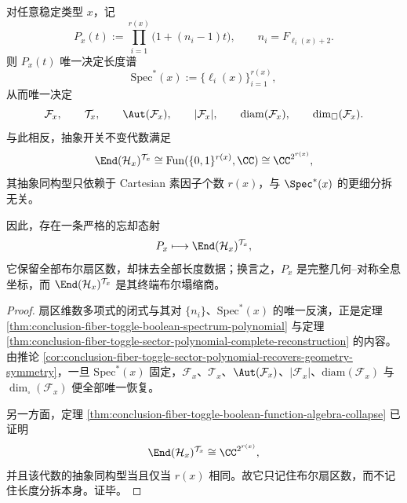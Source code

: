 \begin{theorem}\label{thm:conclusion-sector-polynomial-vs-toggle-algebra-holography-collapse-splitting}
对任意稳定类型 \(x\)，记
\[
P_x(t):=\prod_{i=1}^{r(x)}\bigl(1+(n_i-1)t\bigr),
\qquad
n_i=F_{\ell_i(x)+2}.
\]
则 \(P_x(t)\) 唯一决定长度谱
\[
\mathrm{Spec}^\ast(x):=\{\ell_i(x)\}_{i=1}^{r(x)},
\]
从而唯一决定
\[
\mathcal F_x,\qquad
\mathcal T_x,\qquad
\Aut(\mathcal F_x),\qquad
|\mathcal F_x|,\qquad
\mathrm{diam}(\mathcal F_x),\qquad
\dim_\square(\mathcal F_x).
\]
与此相反，抽象开关不变代数满足
\[
\End(\mathcal H_x)^{\mathcal T_x}
\cong
\mathrm{Fun}(\{0,1\}^{r(x)},\CC)
\cong
\CC^{2^{r(x)}},
\]
其抽象同构型只依赖于 Cartesian 素因子个数 \(r(x)\)，与 \(\Spec^\ast(x)\) 的更细分拆无关。

因此，存在一条严格的忘却态射
\[
P_x
\longmapsto
\End(\mathcal H_x)^{\mathcal T_x},
\]
它保留全部布尔扇区数，却抹去全部长度数据；换言之，\(P_x\) 是完整几何--对称全息坐标，而 \(\End(\mathcal H_x)^{\mathcal T_x}\) 是其终端布尔塌缩商。
\end{theorem}
\begin{proof}
扇区维数多项式的闭式与其对 \(\{n_i\}\)、\(\mathrm{Spec}^\ast(x)\) 的唯一反演，正是定理 \ref{thm:conclusion-fiber-toggle-boolean-spectrum-polynomial} 与定理 \ref{thm:conclusion-fiber-toggle-sector-polynomial-complete-reconstruction} 的内容。由推论 \ref{cor:conclusion-fiber-toggle-sector-polynomial-recovers-geometry-symmetry}，一旦 \(\mathrm{Spec}^\ast(x)\) 固定，\(\mathcal F_x\)、\(\mathcal T_x\)、\(\Aut(\mathcal F_x)\)、\(|\mathcal F_x|\)、\(\mathrm{diam}(\mathcal F_x)\) 与 \(\dim_\square(\mathcal F_x)\) 便全部唯一恢复。

另一方面，定理 \ref{thm:conclusion-fiber-toggle-boolean-function-algebra-collapse} 已证明
\[
\End(\mathcal H_x)^{\mathcal T_x}\cong \CC^{2^{r(x)}},
\]
并且该代数的抽象同构型当且仅当 \(r(x)\) 相同。故它只记住布尔扇区数，而不记住长度分拆本身。证毕。
\end{proof}

